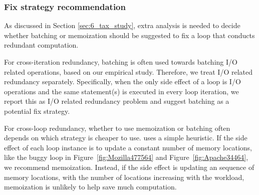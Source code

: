 

\subsubsection{Fix strategy recommendation}
\label{sec:6_redundant_fix}
As discussed in Section \ref{sec:6_tax_study}, extra analysis is needed to
decide whether batching or memoization should be suggested to fix a 
loop that conducts redundant computation.

For cross-iteration redundancy, batching is often used towards
batching I/O related operations, based on our empirical study. 
Therefore, we treat I/O related redundancy separately.
Specifically, when the only side effect of a loop is I/O operations
and the same statement(s) is executed in every loop iteration, we report this
as I/O related redundancy problem and suggest batching as a potential fix
strategy. 

For cross-loop redundancy, whether to use memoization or batching often
depends on which strategy is cheaper to use. \Tool uses a simple
heuristic. If 
the side effect of each loop instance is to update 
a constant number of memory locations, like the 
buggy loop in Figure~\ref{fig:Mozilla477564} and Figure~\ref{fig:Apache34464}, 
we recommend memoization. Instead, if the side effect is updating 
an sequence of memory locations, with the number of locations increasing
with the workload, memoization is unlikely to help save much computation.




